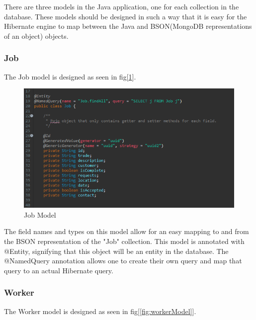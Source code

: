 There are three models in the Java application, one for each collection in the database. These models should be designed in such a way that it is easy for the Hibernate engine to map between the Java and BSON(MongoDB representations of an object) objects.

\subsubsection{Job}
\label{sec:SystemDesignJob}

The Job model is designed as seen in fig[\ref{fig:jobModel}]. 

\begin{figure}[H]
    \centering
    \includegraphics[width=\textwidth, height=180pt]{DesignImages/JobModel.PNG}
    \caption{Job Model}
    \label{fig:jobModel}
\end{figure}

\bigskip

The field names and types on this model allow for an easy mapping to and from the BSON representation of the "Job" collection. This model is annotated with @Entity, signifying that this object will be an entity in the database. The @NamedQuery annotation allows one to create their own query and map that query to an actual Hibernate query.

\subsubsection{Worker}
\label{sec:SystemDesignWorker}

The Worker model is designed as seen in fig[\ref{fig:workerModel}].

